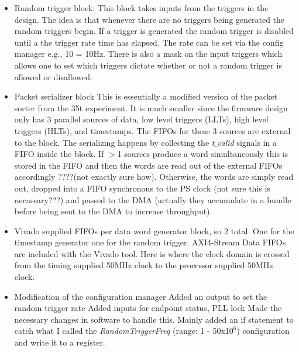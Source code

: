 \documentclass[]{report}
\begin{document}
	\begin{itemize}
		\item Random trigger block:
			\subitem This block takes inputs from the triggers in the design. The idea is that whenever there are no triggers being generated the random triggers begin. If a trigger is generated the random trigger is disabled until a the trigger rate time has elapsed. The rate can be set via the config manager e.g., 10 = 10Hz. There is also a mask on the input triggers which allows one to set which triggers dictate whether or not a random trigger is allowed or disallowed. 
		\item Packet serializer block
			\subitem This is essentially a modified version of the packet sorter from the 35t experiment. It is much smaller since the firmware design only has 3 parallel sources of data, low level triggers (LLTs), high level triggers (HLTs), and timestamps. The FIFOs for these 3 sources are external to the block. The serializing happens by collecting the \textit{t$\_$valid} signals in a FIFO inside the block. If $>$1 sources produce a word simultaneously this is stored in the FIFO and then the words are read out of the external FIFOs accordingly ????(not exactly sure how). Otherwise, the words are simply read out, dropped into a FIFO synchronous to the PS clock (not sure this is necassary???) and passed to the DMA (actually they accumulate in a bundle before being sent to the DMA to increase throughput).
		\item Vivado supplied FIFOs per data word generator block, so 2 total. One for the timestamp generator one for the random trigger.
			\subitem AXI4-Stream Data FIFOs are included with the Vivado tool. Here is where the clock domain is crossed from the timing supplied 50MHz clock to the processor supplied 50MHz clock.
		\item Modification of the configuration manager
			\subitem Added an output to set the random trigger rate
			\subitem Added inputs for endpoint status, PLL lock
			\subitem Made the necessary changes in software to handle this. Mainly added an if statement to catch what I called the \textit{RandomTriggerFreq} (range: 1 - 50x1$0^6$) configuration and write it to a register.
	\end{itemize}
	
\end{document}
